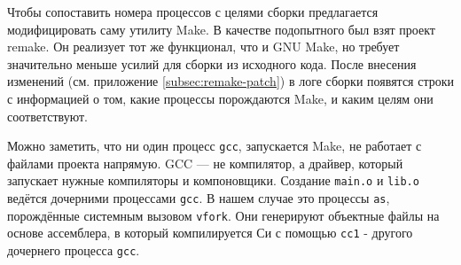 Чтобы сопоставить номера процессов с целями сборки предлагается модифицировать саму утилиту Make. В качестве подопытного был взят проект remake. Он реализует тот же функционал, что и GNU Make, но требует значительно меньше усилий для сборки из исходного кода. После внесения изменений (см. приложение \ref{subsec:remake-patch}) в логе сборки появятся строки с информацией о том, какие процессы порождаются Make, и каким целям они соответствуют.



Можно заметить, что ни один процесс \texttt{gcc}, запускается Make, не работает с файлами проекта напрямую. GCC --- не компилятор, а драйвер, который запускает нужные компиляторы и компоновщики. Создание \texttt{main.o} и \texttt{lib.o} ведётся дочерними процессами \texttt{gcc}. В нашем случае это процессы \texttt{as}, порождённые системным вызовом \texttt{vfork}. Они генерируют объектные файлы на основе ассемблера, в который компилируется Си с помощью \texttt{cc1} - другого дочернего процесса \texttt{gcc}.

